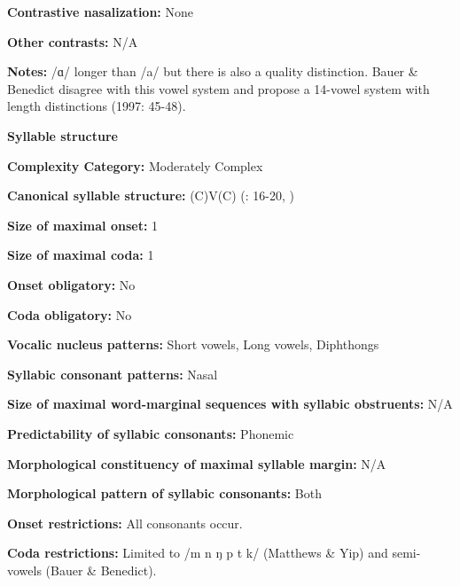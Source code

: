\textbf{Contrastive nasalization:} None



\textbf{Other contrasts:} N/A



\textbf{Notes:} /ɑ/ longer than /a/ but there is also a quality distinction. Bauer \& Benedict disagree with this vowel system and propose a 14-vowel system with length distinctions (1997: 45-48).



\textbf{Syllable structure}



\textbf{Complexity Category:} Moderately Complex



\textbf{Canonical syllable structure:} (C)V(C) (\citealt{MatthewsYip1994}: 16-20, \citealt{BauerBenedict1997})



\textbf{Size of maximal onset:} 1



\textbf{Size of maximal coda:} 1



\textbf{Onset obligatory:} No



\textbf{Coda obligatory:} No



\textbf{Vocalic nucleus patterns:} Short vowels, Long vowels, Diphthongs



\textbf{Syllabic consonant patterns:} Nasal



\textbf{Size of maximal word{}-marginal sequences with syllabic obstruents:} N/A



\textbf{Predictability of syllabic consonants:} Phonemic



\textbf{Morphological constituency of maximal syllable margin:} N/A



\textbf{Morphological pattern of syllabic consonants:} Both



\textbf{Onset restrictions:} All consonants occur.



\textbf{Coda restrictions:} Limited to /m n ŋ p t k/ (Matthews \& Yip) and semi-vowels (Bauer \& Benedict).



